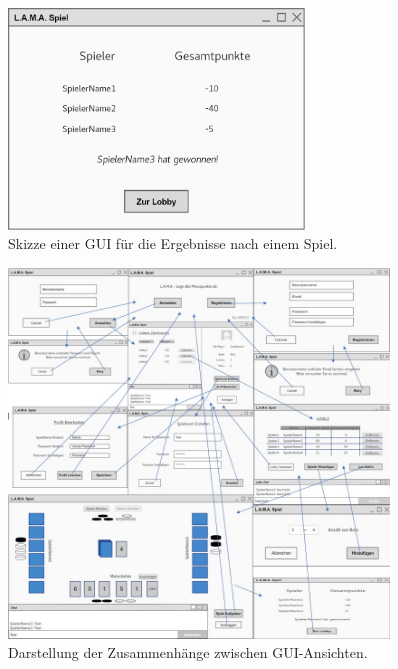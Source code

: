 \begin{figure}
	\centering
	\includegraphics[width=0.7\textwidth]{img/spielbeendet}
	\caption{Skizze einer GUI für die Ergebnisse nach einem Spiel.}
	\label{gui:results}
\end{figure}
\begin{figure}
	\centering
	\includegraphics[width=0.9\textwidth]{img/alles3}
	\caption{Darstellung der Zusammenhänge zwischen GUI-Ansichten.}
	\label{gui:zusammenhang}
\end{figure}
